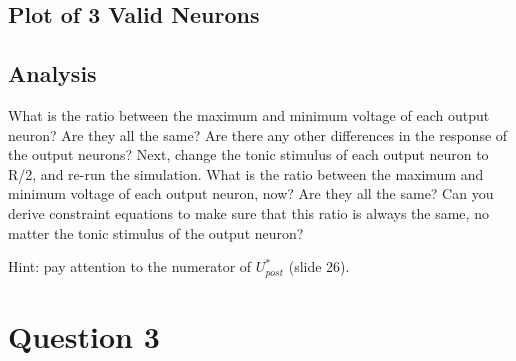 \documentclass[12pt, letterpaper, oneside, notitlepage, onecolumn]{article}
\begin{document}
\subsection{Plot of 3 Valid Neurons}


\subsection{Analysis}

What is the ratio between the maximum and minimum voltage of each output
neuron? Are they all the same? Are there any other differences in the response
of the output neurons? Next, change the tonic stimulus of each output neuron 
to R/2, and re-run the simulation. What is the ratio between the maximum and 
minimum voltage of each output neuron, now? Are they all the same? Can you 
derive constraint equations to make sure that this ratio is always the
same, no matter the tonic stimulus of the output neuron?

Hint: pay attention to the numerator of $U^{*}_{post}$ (slide 26).


\section{Question 3}
\end{document}
